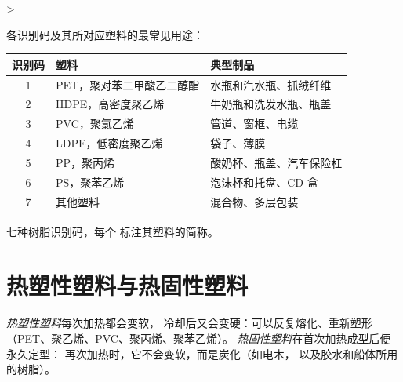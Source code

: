 > \begin{proposition}[七种识别码]\label{prop:g8:plastics:codes}
各识别码及其所对应塑料的最常见用途：
\begin{center}
\small
\begin{tabular}{cll}
\hline
识别码 & 塑料 & 典型制品 \\
\hline
1 & PET，聚对苯二甲酸乙二醇酯 & 水瓶和汽水瓶、抓绒纤维 \\
2 & HDPE，高密度聚乙烯 & 牛奶瓶和洗发水瓶、瓶盖 \\
3 & PVC，聚氯乙烯 & 管道、窗框、电缆 \\
4 & LDPE，低密度聚乙烯 & 袋子、薄膜 \\
5 & PP，聚丙烯 & 酸奶杯、瓶盖、汽车保险杠 \\
6 & PS，聚苯乙烯 & 泡沫杯和托盘、CD 盒 \\
7 & 其他塑料 & 混合物、多层包装 \\
\hline
\end{tabular}
\end{center}
\end{proposition}

\begin{omfigure}

{\small 七种树脂识别码，每个
标注其塑料的简称。}
\end{omfigure}

\section{热塑性塑料与热固性塑料}

\begin{definition}[热塑性塑料与热固性塑料]\label{def:g8:plastics:thermoplastic}
\emph{热塑性塑料}每次加热都会变软，
冷却后又会变硬：可以反复熔化、重新塑形
（PET、聚乙烯、PVC、聚丙烯、聚苯乙烯）。
\emph{热固性塑料}在首次加热成型后便永久定型：
再次加热时，它不会变软，而是炭化（如电木，
以及胶水和船体所用的树脂）。
\end{definition}

